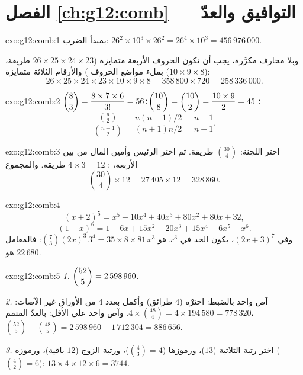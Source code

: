 \section*{الفصل \ref{ch:g12:comb} --- التوافيق والعدّ}

\begin{solution}{exo:g12:comb:1}
بمبدأ الضرب:
$26^2 \times 10^3 \times 26^2 = 26^4 \times 10^3 = 456\,976\,000$.

وبلا محارف مكرَّرة، يجب أن تكون الحروف الأربعة متمايزة
($26 \times 25 \times 24 \times 23$ طريقة، بملء مواضع الحروف
) والأرقام الثلاثة متمايزة ($10 \times 9 \times 8$):
\[
26 \times 25 \times 24 \times 23 \times 10 \times 9 \times 8
= 358\,800 \times 720 = 258\,336\,000 .
\]
\end{solution}

\begin{solution}{exo:g12:comb:2}
$\dbinom83 = \dfrac{8 \times 7 \times 6}{3!} = 56$؛
$\dbinom{10}{8} = \dbinom{10}{2} = \dfrac{10 \times 9}{2} = 45$؛
\[
\frac{\binom n2}{\binom{n+1}2}
= \frac{n(n-1)/2}{(n+1)n/2} = \frac{n-1}{n+1}.
\]
\end{solution}

\begin{solution}{exo:g12:comb:3}
اختر اللجنة: $\binom{30}{4}$ طريقة. ثم اختر الرئيس وأمين
المال من بين الأربعة، : $4 \times 3 = 12$ طريقة. والمجموع
\[
\binom{30}{4} \times 12 = 27\,405 \times 12 = 328\,860 .
\]
\end{solution}

\begin{solution}{exo:g12:comb:4}
\[
(x+2)^5 = x^5 + 10x^4 + 40x^3 + 80x^2 + 80x + 32 ,
\]
\[
(1-x)^6 = 1 - 6x + 15x^2 - 20x^3 + 15x^4 - 6x^5 + x^6 .
\]
وفي $(2x+3)^7$، يكون الحد في $x^3$ هو
$\binom{7}{3}(2x)^3\,3^4 = 35 \times 8 \times 81\, x^3$: فالمعامل هو
$22\,680$.
\end{solution}

\begin{solution}{exo:g12:comb:5}
\emph{1.} $\dbinom{52}{5} = 2\,598\,960$.

\emph{2.} آص واحد بالضبط: اخترْه ($4$ طرائق) وأكمل بعدد $4$ من الأوراق
غير الآصات: $4 \times \binom{48}{4} = 4 \times 194\,580 = 778\,320$.
وآص واحد على الأقل: بالعدّ المتمم،
$\binom{52}{5} - \binom{48}{5} = 2\,598\,960 - 1\,712\,304 = 886\,656$.

\emph{3.} اختر رتبة الثلاثية ($13$)، ورموزها
($\binom43 = 4$)، ورتبة الزوج ($12$ باقية)، ورموزه
($\binom42 = 6$):
$13 \times 4 \times 12 \times 6 = 3744$.
\end{solution}

